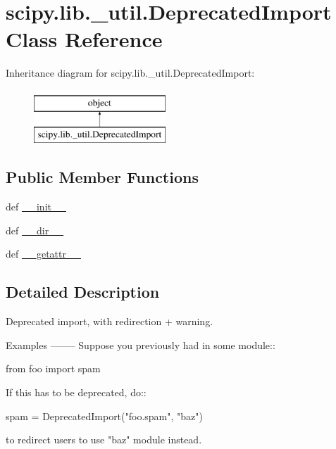 \hypertarget{classscipy_1_1lib_1_1__util_1_1DeprecatedImport}{}\section{scipy.\+lib.\+\_\+util.\+Deprecated\+Import Class Reference}
\label{classscipy_1_1lib_1_1__util_1_1DeprecatedImport}
Inheritance diagram for scipy.\+lib.\+\_\+util.\+Deprecated\+Import\+:\begin{figure}[H]
\begin{center}
\leavevmode
\includegraphics[height=2.000000cm]{classscipy_1_1lib_1_1__util_1_1DeprecatedImport}
\end{center}
\end{figure}
\subsection*{Public Member Functions}
\begin{DoxyCompactItemize}
\item 
def \hyperlink{classscipy_1_1lib_1_1__util_1_1DeprecatedImport_a99f233eb63c409befd4c4c96010e3ffb}{\+\_\+\+\_\+init\+\_\+\+\_\+}
\item 
def \hyperlink{classscipy_1_1lib_1_1__util_1_1DeprecatedImport_ab5ccaceadcc1e062721cbb2bf3012a3e}{\+\_\+\+\_\+dir\+\_\+\+\_\+}
\item 
def \hyperlink{classscipy_1_1lib_1_1__util_1_1DeprecatedImport_ac2745a2d6b44e29cac4cd9f6e93ef69f}{\+\_\+\+\_\+getattr\+\_\+\+\_\+}
\end{DoxyCompactItemize}


\subsection{Detailed Description}
\begin{DoxyVerb}Deprecated import, with redirection + warning.

Examples
--------
Suppose you previously had in some module::

    from foo import spam

If this has to be deprecated, do::

    spam = DeprecatedImport("foo.spam", "baz")

to redirect users to use "baz" module instead.\end{DoxyVerb}
 

